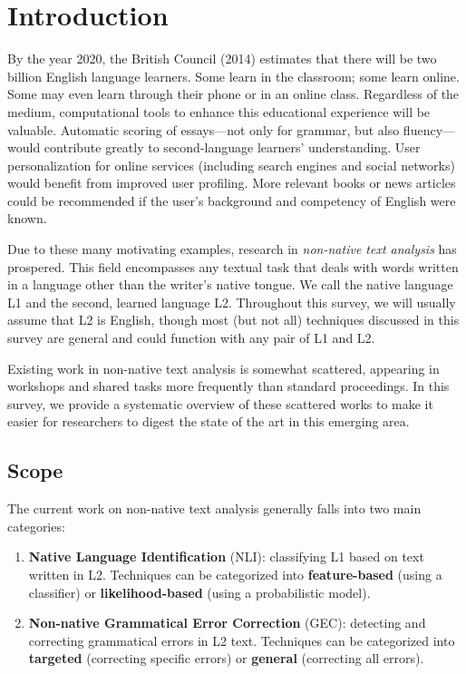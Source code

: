 \section{Introduction}
\label{sec:introduction}

By the year 2020, the British Council (2014) estimates that there will be two
billion English language learners. Some learn in the classroom; some learn
online. Some may even learn through their phone or in an online class.
Regardless of the medium, computational tools to enhance this educational
experience will be valuable. Automatic scoring of essays---not only for grammar,
but also fluency---would contribute greatly to second-language learners'
understanding. User personalization for online services (including search
engines and social networks) would benefit from improved user profiling. More
relevant books or news articles could be recommended if the user's background
and competency of English were known.

Due to these many motivating examples, research in \emph{non-native text
analysis} has prospered. This field encompasses any textual task that deals with
words written in a language other than the writer's native tongue. We call the
native language L1 and the second, learned language L2. Throughout this survey,
we will usually assume that L2 is English, though most (but not all) techniques
discussed in this survey are general and could function with any pair of L1 and
L2.

Existing work in non-native text analysis is somewhat scattered, appearing in
workshops and shared tasks more frequently than standard proceedings. In this
survey, we provide a systematic overview of these scattered works to make it
easier for researchers to digest the state of the art in this emerging area.

\subsection{Scope}

The current work on non-native text analysis generally falls into two main
categories:

\begin{enumerate}
    \item \textbf{Native Language Identification} (NLI): classifying L1 based on
        text written in L2. Techniques can be categorized into
        \textbf{feature-based} (using a classifier) or \textbf{likelihood-based}
        (using a probabilistic model).
    \item \textbf{Non-native Grammatical Error Correction} (GEC): detecting and
        correcting grammatical errors in L2 text. Techniques can be categorized
        into \textbf{targeted} (correcting specific errors) or \textbf{general}
        (correcting all errors).
\end{enumerate}

